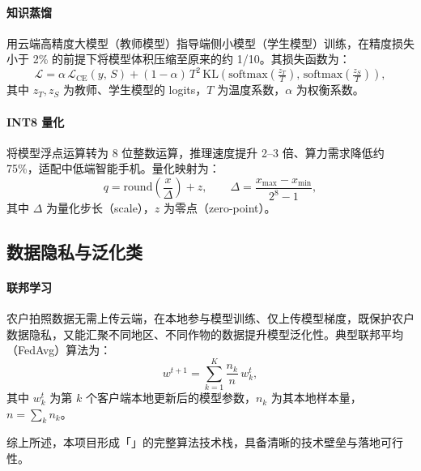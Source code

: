 \paragraph{知识蒸馏}
用云端高精度大模型（教师模型）指导端侧小模型（学生模型）训练，在精度损失小于 2\% 的前提下将模型体积压缩至原来的约 1/10。其损失函数为：
\begin{equation}
  \mathcal{L} = \alpha\,\mathcal{L}_{\mathrm{CE}}(y,\, S) + (1-\alpha)\, T^{2}\,\mathrm{KL}\!\left(\mathrm{softmax}\!\left(\tfrac{z_T}{T}\right),\, \mathrm{softmax}\!\left(\tfrac{z_S}{T}\right)\right),
\end{equation}
其中 $z_T,z_S$ 为教师、学生模型的 logits，$T$ 为温度系数，$\alpha$ 为权衡系数。

\paragraph{INT8 量化}
将模型浮点运算转为 8 位整数运算，推理速度提升 2--3 倍、算力需求降低约 75\%，适配中低端智能手机。量化映射为：
\begin{equation}
  q = \mathrm{round}\!\left(\frac{x}{\Delta}\right) + z,\qquad \Delta = \frac{x_{\max} - x_{\min}}{2^{8} - 1},
\end{equation}
其中 $\Delta$ 为量化步长（scale），$z$ 为零点（zero-point）。

\subsection{数据隐私与泛化类}

\paragraph{联邦学习}
农户拍照数据无需上传云端，在本地参与模型训练、仅上传模型梯度，既保护农户数据隐私，又能汇聚不同地区、不同作物的数据提升模型泛化性。典型联邦平均（FedAvg）算法为：
\begin{equation}
  w^{t+1} = \sum_{k=1}^{K} \frac{n_k}{n}\, w_k^{t},
\end{equation}
其中 $w_k^{t}$ 为第 $k$ 个客户端本地更新后的模型参数，$n_k$ 为其本地样本量，$n=\sum_k n_k$。

综上所述，本项目形成「」的完整算法技术栈，具备清晰的技术壁垒与落地可行性。
